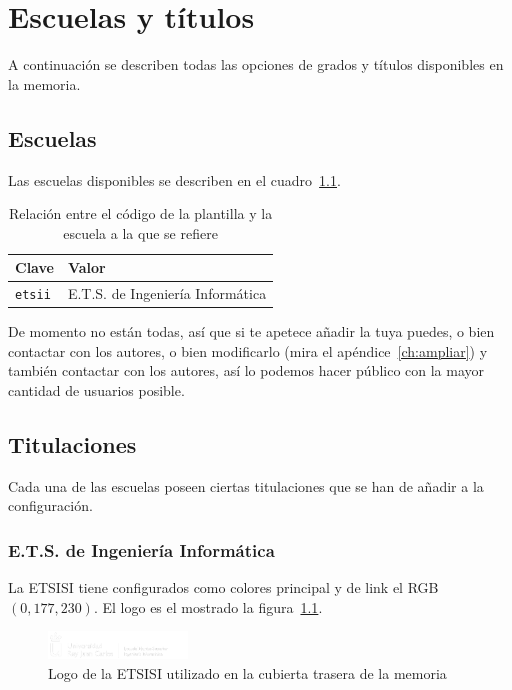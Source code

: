 \chapter{Escuelas y títulos}
\label{ch:escuelas-y-titulos}

A continuación se describen todas las opciones de grados y títulos disponibles en la memoria.

\section{Escuelas}

Las escuelas disponibles se describen en el cuadro~\ref{tbl:schools}.

\begin{table}
    \centering
    \begin{tabularx}{\textwidth}{@{}lX@{}}
        \toprule
        \textbf{Clave}  & \textbf{Valor} \\
        \midrule
        \texttt{etsii} & E.T.S. de Ingeniería Informática \\
        \bottomrule
    \end{tabularx}
    \caption{\label{tbl:schools} Relación entre el código de la plantilla y la escuela a la que se refiere}
\end{table}

De momento no están todas, así que si te apetece añadir la tuya puedes, o bien contactar con los autores, o bien modificarlo (mira el apéndice~\ref{ch:ampliar}) y también contactar con los autores, así lo podemos hacer público con la mayor cantidad de usuarios posible.

\section{Titulaciones}

Cada una de las escuelas poseen ciertas titulaciones que se han de añadir a la configuración.


\subsection{E.T.S. de Ingeniería Informática}

La ETSISI tiene configurados como colores principal y de link el RGB $(0,177,230)$. El logo es el mostrado la figura~\ref{fig:logo-etsisi}.

\begin{figure}
    \centering
    \includegraphics[width=10em]{urjc-report/logos/logo-urjc-etsii.png}
    \caption{\label{fig:logo-etsisi}Logo de la ETSISI utilizado en la cubierta trasera de la memoria}
\end{figure}

